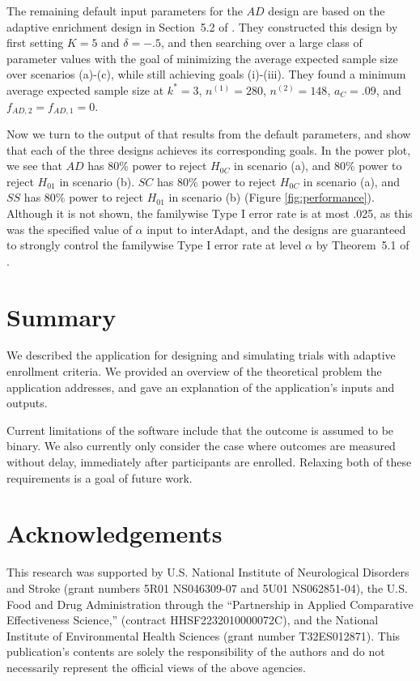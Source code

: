 \documentclass[article]{jss}
\begin{document}
The remaining default input parameters for the $AD$ design are based on the adaptive enrichment design in Section~5.2 of \citep{Rosenblum2013AdaptMISTIE}. 
They constructed this design by first setting  $K=5$ and $δ=-.5$, and then searching over a large class of parameter values with the goal of minimizing the average expected sample size over scenarios (a)-(c), while still achieving goals (i)-(iii). They found a minimum average expected sample size at $k^*=3$, $n^{(1)}=280$, $n^{(2)}=148$, $a_C = .09$, and $f_{AD,2}=f_{AD,1}=0$. %


Now we turn to the output of  that results from the default parameters, and show that each of the three designs achieves its corresponding goals. In the power plot, we see that $AD$ has 80\% power to reject $H_{0C}$ in scenario (a), and 80\% power to reject $H_{01}$ in scenario (b). $SC$ has 80\% power to reject $H_{0C}$ in scenario (a), and $SS$ has 80\% power to reject $H_{01}$ in scenario (b) (Figure \ref{fig:performance}). Although it is not shown,  the familywise Type I error rate is at most  .025, as this was the specified value of $\alpha$ input to \textsf{interAdapt}, and the designs are guaranteed to strongly control the familywise Type I error rate at level $\alpha$ by
 Theorem~5.1 of  \citep{Rosenblum2013AdaptMISTIE}.


\section*{Summary}
\label{sec:Summary}

We described the  application for designing and simulating trials with adaptive enrollment criteria. We provided an overview of the theoretical problem the application addresses, and gave an explanation of the application's inputs and outputs.

Current limitations of the software include that the outcome is assumed to be binary. We also currently only consider the case where outcomes are measured without delay, immediately after participants are enrolled. Relaxing both of these requirements is a goal of future work.


\section*{Acknowledgements}
\label{sec:acknowledgements}
This research was supported by U.S. National Institute of Neurological Disorders and Stroke (grant numbers 5R01 NS046309-07 and 5U01 NS062851-04), the U.S. Food and Drug Administration through the ``Partnership in Applied Comparative Effectiveness Science,'' (contract HHSF2232010000072C), and the National Institute of Environmental Health Sciences (grant number T32ES012871). This publication's contents are solely the responsibility of the authors and do not necessarily represent the official views of the above agencies.



 
\end{document}
